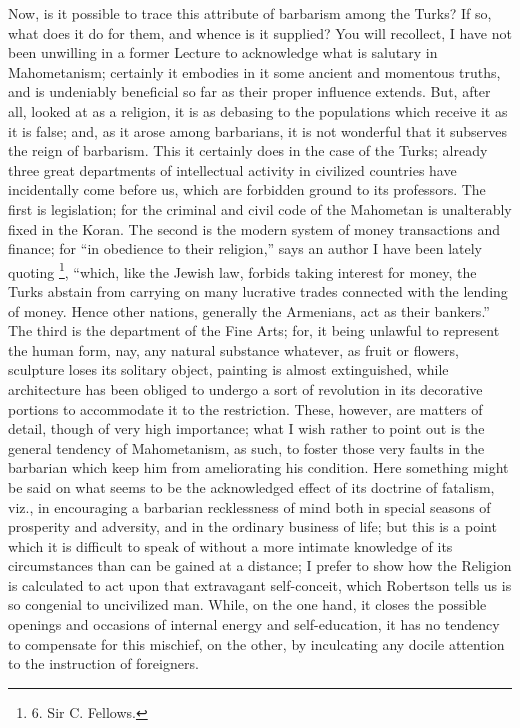 Now, is it possible to trace
this attribute of barbarism among the Turks? If so, what does it do
for them, and whence is it supplied? You will recollect, I have not
been unwilling in a former Lecture to acknowledge what is salutary in
Mahometanism; certainly it embodies in it some ancient and momentous
truths, and is undeniably beneficial so far as their proper influence
extends. But, after all, looked at as a religion, it is as debasing to
the populations which receive it as it is false; and, as it
arose among barbarians, it is not wonderful that it subserves the
reign of barbarism. This it certainly does in the case of the Turks;
already three great departments of intellectual activity in civilized
countries have incidentally come before us, which are forbidden ground
to its professors. The first is legislation; for the criminal and
civil code of the Mahometan is unalterably fixed in the Koran. The
second is the modern system of money transactions and finance; for ``in
obedience to their religion,'' says an author I have been lately
quoting \footnote{6.
Sir C. Fellows.}, ``which,
like the Jewish law, forbids taking interest for money, the Turks
abstain from carrying on many lucrative trades connected with the
lending of money. Hence other nations, generally the Armenians, act as
their bankers.'' The third is the department of the Fine Arts; for, it
being unlawful to represent the human form, nay, any natural substance
whatever, as fruit or flowers, sculpture loses its solitary object,
painting is almost extinguished, while architecture has been obliged
to undergo a sort of revolution in its decorative portions to
accommodate it to the restriction. These, however, are matters of
detail, though of very high importance; what I wish rather to point
out is the general tendency of Mahometanism, as such, to foster those
very faults in the barbarian which keep him from ameliorating his
condition. Here something might be said on what seems to be the
acknowledged effect of its doctrine of fatalism, viz., in encouraging
a barbarian recklessness of mind both in special seasons of prosperity
and adversity, and in the ordinary business of life; but this is a
point which it is difficult to speak of without a more intimate
knowledge of its circumstances than can be gained at a distance; I
prefer to show how the Religion is calculated to act upon that
extravagant self-conceit, which Robertson tells us is so congenial to
uncivilized man. While, on the one hand, it closes the possible
openings and occasions of internal energy and self-education, it has
no tendency to compensate for this mischief, on the other, by
inculcating any docile attention to the instruction of foreigners.


